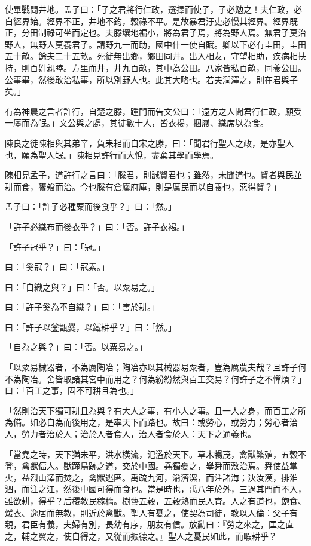 \documentclass[12pt,a4paper]{ctexbook}
\begin{document}
使畢戰問井地。孟子曰：「子之君將行仁政，選擇而使子，子必勉之！夫仁政，必自經界始。經界不正，井地不鈞，穀祿不平。是故暴君汙吏必慢其經界。經界既正，分田制祿可坐而定也。夫滕壤地褊小，將為君子焉，將為野人焉。無君子莫治野人，無野人莫養君子。請野九一而助，國中什一使自賦。卿以下必有圭田，圭田五十畝。餘夫二十五畝。死徙無出鄉，鄉田同井。出入相友，守望相助，疾病相扶持，則百姓親睦。方里而井，井九百畝，其中為公田。八家皆私百畝，同養公田。公事畢，然後敢治私事，所以別野人也。此其大略也。若夫潤澤之，則在君與子矣。」\par
有為神農之言者許行，自楚之滕，踵門而告文公曰：「遠方之人聞君行仁政，願受一廛而為氓。」文公與之處，其徒數十人，皆衣褐，捆屨、織席以為食。\par
陳良之徒陳相與其弟辛，負耒耜而自宋之滕，曰：「聞君行聖人之政，是亦聖人也，願為聖人氓。」陳相見許行而大悅，盡棄其學而學焉。\par
陳相見孟子，道許行之言曰：「滕君，則誠賢君也；雖然，未聞道也。賢者與民並耕而食，饔飧而治。今也滕有倉廩府庫，則是厲民而以自養也，惡得賢？」\par
孟子曰：「許子必種粟而後食乎？」曰：「然。」\par
「許子必織布而後衣乎？」曰：「否。許子衣褐。」\par
「許子冠乎？」曰：「冠。」\par
曰：「奚冠？」曰：「冠素。」\par
曰：「自織之與？」曰：「否。以粟易之。」\par
曰：「許子奚為不自織？」曰：「害於耕。」\par
曰：「許子以釜甑爨，以鐵耕乎？」曰：「然。」\par
「自為之與？」曰：「否。以粟易之。」\par
「以粟易械器者，不為厲陶冶；陶冶亦以其械器易粟者，豈為厲農夫哉？且許子何不為陶冶。舍皆取諸其宮中而用之？何為紛紛然與百工交易？何許子之不憚煩？」曰：「百工之事，固不可耕且為也。」\par
「然則治天下獨可耕且為與？有大人之事，有小人之事。且一人之身，而百工之所為備。如必自為而後用之，是率天下而路也。故曰：或勞心，或勞力；勞心者治人，勞力者治於人；治於人者食人，治人者食於人：天下之通義也。\par
「當堯之時，天下猶未平，洪水橫流，氾濫於天下。草木暢茂，禽獸繁殖，五穀不登，禽獸偪人。獸蹄鳥跡之道，交於中國。堯獨憂之，舉舜而敷治焉。舜使益掌火，益烈山澤而焚之，禽獸逃匿。禹疏九河，瀹濟漯，而注諸海；決汝漢，排淮泗，而注之江，然後中國可得而食也。當是時也，禹八年於外，三過其門而不入，雖欲耕，得乎？后稷教民稼穡。樹藝五穀，五穀熟而民人育。人之有道也，飽食、煖衣、逸居而無教，則近於禽獸。聖人有憂之，使契為司徒，教以人倫：父子有親，君臣有義，夫婦有別，長幼有序，朋友有信。放勳曰：『勞之來之，匡之直之，輔之翼之，使自得之，又從而振德之。』聖人之憂民如此，而暇耕乎？\par
\end{document}
